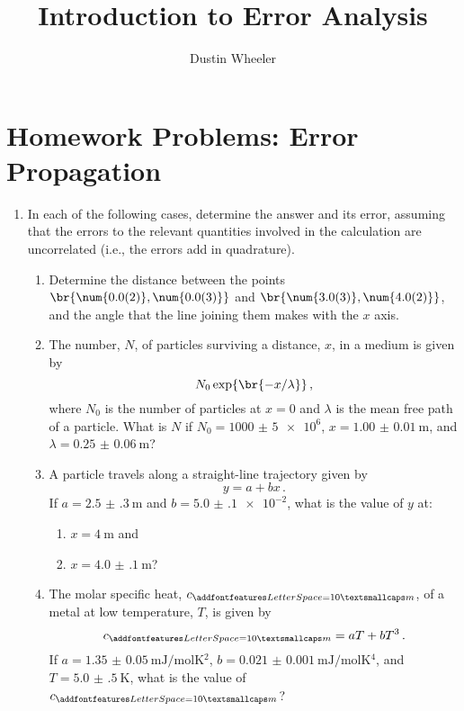 \documentclass[nobib,nofonts,nols,nohyper]{tufte-handout}
\title{Introduction to Error Analysis}
\author{Dustin Wheeler}
\begin{document}
\maketitle

\section{Homework Problems: Error Propagation} %
\label{sec:homework_problems_error_propagation}

\begin{enumerate}
	\item In each of the following cases, determine the answer and its error, assuming that the errors to the relevant quantities involved in the calculation are uncorrelated (i.e., the errors add in quadrature).
	\begin{enumerate}
		\item Determine the distance between the points \( \br{\num{0.0(2)}, \num{0.0(3)}} \) and \( \br{\num{3.0(3)}, \num{4.0(2)}} \), and the angle that the line joining them makes with the \( x \) axis. 
		\item The number, \( N \), of particles surviving a distance, \( x \), in a medium is given by \[ 
		N_0 \exp\br{-x/\lambda} \, ,
		\] 
		where \( N_0 \) is the number of particles at \( x = 0 \) and \( \lambda \) is the mean free path of a particle. 
		What is \( N \) if \( N_0=\num{1000(5)e6} \), \( x = \qty{1.00(1)}{\m} \), and \( \lambda = \qty{0.25(6)}{\m} \)?
		
		\item A particle travels along a straight-line trajectory given by \[
		 y = a + bx \, .
		 \] 
		If \( a = \qty{2.5(3)}{\m} \) and \( b = \num{5.0(1)e-2} \), what is the value of \( y \) at:
		\begin{enumerate}
			\item \( x = \qty{4}{\m} \) and
			
			\item \( x = \qty{4.0(1)}{\m} \)?
		\end{enumerate}
		
		\item The molar specific heat, \( c_{\textsc{m}} \), of a metal at low temperature, \( T \), is given by \[
			c_{\textsc{m}} = a T + b T^3 \, .
		\]
		If \( a = \qty{1.35(5)}{\mJ\per\mol\K^2} \), \( b = \qty{0.021(1)}{\mJ\per\mol\K^4} \), and \( T = \qty{5.0(5)}{\K} \), what is the value of \( c_{\textsc{m}} \)?
	\end{enumerate}
	

\end{enumerate}
\end{document}
